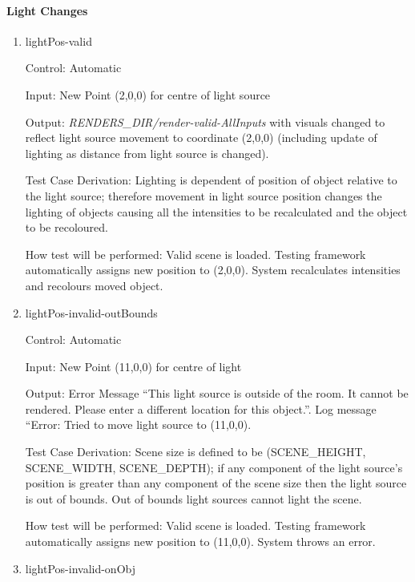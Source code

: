 \documentclass[12pt, titlepage]{article}
\begin{document}
\paragraph{Light Changes}

\begin{enumerate}
	\item{lightPos-valid\\}
	
	Control: Automatic
	
	Input: New Point (2,0,0) for centre of light source
	
	Output: \textit{RENDERS\_DIR/render-valid-AllInputs} with visuals changed 
	to reflect light source movement to coordinate (2,0,0) (including update of 
	lighting as distance from light source is changed).
	
	Test Case Derivation: Lighting is dependent of position of object relative 
	to the light source; therefore movement in light source position changes 
	the lighting of objects causing all the intensities to be recalculated and 
	the object to be recoloured.
	
	How test will be performed: Valid scene is loaded. Testing framework 
	automatically assigns new position to (2,0,0). System recalculates 
	intensities and recolours moved object.
	
	\item{lightPos-invalid-outBounds\\}
	
	Control: Automatic
	
	Input: New Point (11,0,0) for centre of light
	
	Output: Error Message ``This light source is outside of the room. It cannot 
	be rendered. Please enter a different location for this object.''. Log 
	message ``Error: Tried to move light source to (11,0,0).
	
	Test Case Derivation: Scene size is defined to be (SCENE\_HEIGHT, 
	SCENE\_WIDTH, SCENE\_DEPTH); if any component of the light source's 
	position is greater than any component of the scene size then the light 
	source is out of bounds. Out of bounds light sources cannot light the scene.
	
	How test will be performed: Valid scene is loaded. Testing framework 
	automatically assigns new position to (11,0,0). System throws an error.
	
	\item{lightPos-invalid-onObj\\}
	

\end{enumerate}
\end{document}

